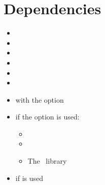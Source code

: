 \section{Dependencies}%
\begin{multicols}{2}
  \begin{itemize}[leftmargin=10pt]
    \item {}
    \item {}
    \item {}
    \item {}
    \item {}
    \item {}
    \item {} with the  option
    \item if the  option is used:
      \begin{itemize}
        \item \TikZ
        \item {}
        \item The \TikZ\ library 
      \end{itemize}
    \item {} if  is used
  \end{itemize}
\end{multicols}

